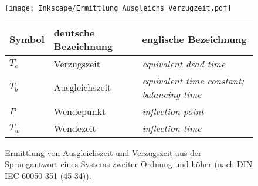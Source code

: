 \begin{figure}[hbtp]
    \begin{center}
        \texttt{[image: Inkscape/Ermittlung\_Ausgleichs\_Verzugzeit.pdf]}
        \vspace{2ex}
            \begin{small}
                \begin{tabular}{|l|p{6.4cm}|p{6.4cm}|}\hline
                \rowcolor{lightgray}\textbf{Symbol} &\textbf{deutsche Bezeichnung} &\textbf{englische Bezeichnung} \\
                \hline
                $T_e$ & Verzugszeit & \textit{equivalent dead time}\\
                $T_b$ & Ausgleichszeit & \textit{equivalent time constant; balancing time}\\
                $P$ & Wendepunkt & \textit{inflection point}\\
                $T_w$ & Wendezeit & \textit{inflection time}\\
                \hline
                \end{tabular}
            \end{small}
    \end{center}
    \caption{Ermittlung von Ausgleichszeit und Verzugszeit aus der Sprungantwort eines Systems zweiter Ordnung und höher (nach DIN IEC 60050-351 (45-34)).}
    \label{fig:ermittlung_verzugszeit}
\end{figure}

